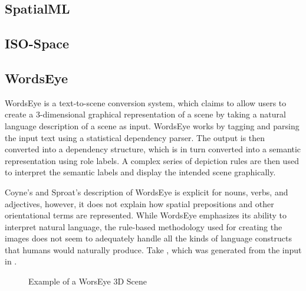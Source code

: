 \documentclass[11pt]{article}
\begin{document}
\subsection{SpatialML} %
\label{sub:spatialml}


\subsection{ISO-Space} %
\label{sub:iso_space}


\subsection{WordsEye} %
\label{sub:wordseye}

WordsEye \cite{coyne2001wordseye} is a text-to-scene conversion system, which claims to allow users to create a 3-dimensional graphical representation of a scene by taking a natural language description of a scene as input. WordsEye works by tagging and parsing the input text using a statistical dependency parser. The output is then converted into a dependency structure, which is in turn converted into a semantic representation using role labels. A complex series of depiction rules are then used to interpret the semantic labels and display the intended scene graphically.

Coyne's and Sproat's description of WordsEye is explicit for nouns, verbs, and adjectives, however, it does not explain how spatial prepositions and other orientational terms are represented. While WordsEye emphasizes its ability to interpret natural language, the rule-based methodology used for creating the images does not seem to adequately handle all the kinds of language constructs that humans would naturally produce. Take , which was generated from the input in .

\label{ex:wordseye-1}

\begin{figure}
    \begin{center}
    \end{center}
    \caption{Example of a WorsEye 3D Scene}
    \label{fig:wordseye-1}
\end{figure}
\end{document}
